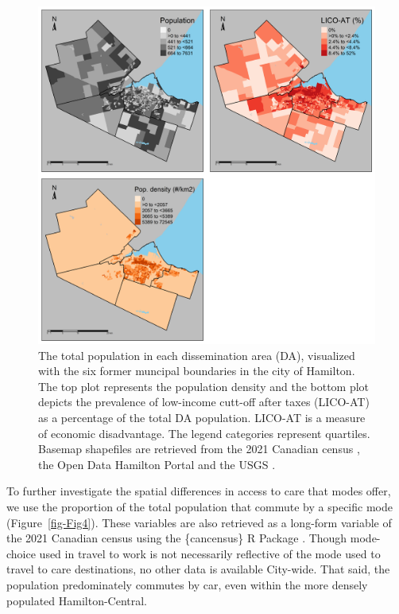 \documentclass[
  super,
  preprint,
  3p]{elsarticle}
\begin{document}
\begin{figure}

{\centering \includegraphics[width=6.25in,height=\textheight]{figures/Fig3-plot_pops.png}

}

\caption{\label{fig-Fig3}The total population in each dissemination area
(DA), visualized with the six former muncipal boundaries in the city of
Hamilton. The top plot represents the population density and the bottom
plot depicts the prevalence of low-income cutt-off after taxes (LICO-AT)
as a percentage of the total DA population. LICO-AT is a measure of
economic disadvantage. The legend categories represent quartiles.
Basemap shapefiles are retrieved from the 2021 Canadian census
\citep{governmentofcanadaCensusPopulation2023}, the Open Data Hamilton
Portal \citep{opendatahamiltonCityBoundary2023} and the USGS
\citep{greatlakesUSGS2010}.}

\end{figure}

To further investigate the spatial differences in access to care that
modes offer, we use the proportion of the total population that commute
by a specific mode (Figure~\ref{fig-Fig4}). These variables are also
retrieved as a long-form variable of the 2021 Canadian census using the
\{cancensus\} R Package
\citep{governmentofcanadaCensusPopulation2023, vonbergmannCancensusCensusMapper2021}.
Though mode-choice used in travel to work is not necessarily reflective
of the mode used to travel to care destinations, no other data is
available City-wide. That said, the population predominately commutes by
car, even within the more densely populated Hamilton-Central.
\end{document}

